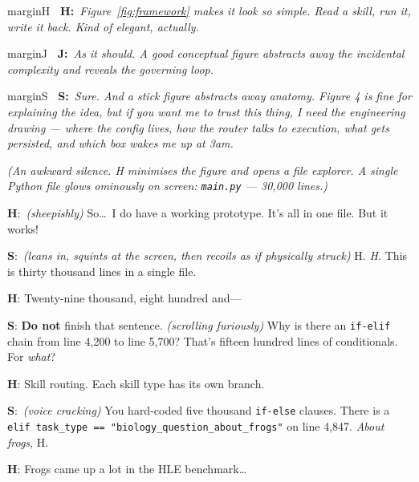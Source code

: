 \documentclass[11pt,a4paper]{article}
\newcommand{\profJ}[1]{%
  \begin{inlinenote}{marginJ}%
  \textbf{\color{marginJ}\faGraduationCap~J:}~\textit{#1}%
  \end{inlinenote}%
}
\newcommand{\studentH}[1]{%
  \begin{inlinenote}{marginH}%
  \textbf{\color{marginH}\faFire~H:}~\textit{#1}%
  \end{inlinenote}%
}
\newcommand{\seniorS}[1]{%
  \begin{inlinenote}{marginS}%
  \textbf{\color{marginS}\faServer~S:}~\textit{#1}%
  \end{inlinenote}%
}
\newcommand{\Hstudent}[0]{{\sffamily\bfseries\color{marginH}H}}
\newcommand{\Senior}[0]{{\sffamily\bfseries\color{marginS}S}}
\newcommand{\stage}[1]{{\small\itshape\color{black!50}(#1)}}
\begin{document}
\begin{bridgebox}
\studentH{Figure~\ref{fig:framework} makes it look so simple. Read a skill, run it, write it back. Kind of elegant, actually.}

\profJ{As it should. A good conceptual figure abstracts away the incidental complexity and reveals the governing loop.}


\seniorS{Sure. And a stick figure abstracts away anatomy. Figure 4 is fine for explaining the idea, but if you want me to trust this thing, I need the engineering drawing --- where the config lives, how the router talks to execution, what gets persisted, and which box wakes me up at 3am.}

\end{bridgebox}

\begin{dialogue}

\stage{An awkward silence. H minimises the figure and opens a file explorer. A single Python file glows ominously on screen: \texttt{main.py} --- 30{,}000 lines.}

\vspace{4pt}
\Hstudent:~\stage{sheepishly} So\ldots\ I do have a working prototype. It's all in one file. But it works!

\vspace{4pt}
\Senior:~\stage{leans in, squints at the screen, then recoils as if physically struck} H. \textit{H.} This is thirty thousand lines in a single file.

\vspace{4pt}
\Hstudent: Twenty-nine thousand, eight hundred and---

\vspace{4pt}
\Senior: \textbf{Do not} finish that sentence. \stage{scrolling furiously} Why is there an \texttt{if-elif} chain from line 4,200 to line 5,700? That's fifteen hundred lines of conditionals. For \textit{what}?

\vspace{4pt}
\Hstudent: Skill routing. Each skill type has its own branch.

\vspace{4pt}
\Senior:~\stage{voice cracking} You hard-coded five thousand \texttt{if-else} clauses. There is a \texttt{elif task\_type == "biology\_question\_about\_frogs"} on line 4,847. \textit{About frogs}, H.

\vspace{4pt}
\Hstudent: Frogs came up a lot in the HLE benchmark\ldots


\end{dialogue}
\end{document}
